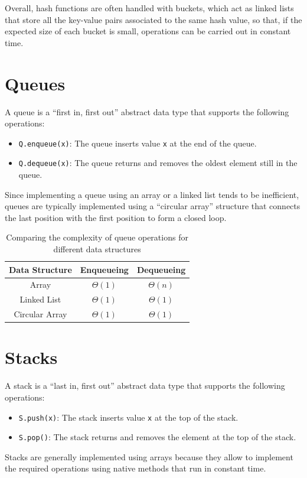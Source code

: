 \documentclass{report}
\begin{document}
\noindent Overall, hash functions are often handled with buckets, which act as linked lists that store all the key-value pairs associated to the same hash value, so that, if the expected size of each bucket is small, operations can be carried out in constant time.
\section{Queues}
A queue is a ``first in, first out'' abstract data type that supports the following operations:
\begin{itemize}
    \item \texttt{Q.enqueue(x)}: The queue inserts value \texttt{x} at the end of the queue.
    \item \texttt{Q.dequeue(x)}: The queue returns and removes the oldest element still in the queue.
\end{itemize}
Since implementing a queue using an array or a linked list tends to be inefficient, queues are typically implemented using a ``circular array'' structure that connects the last position with the first position to form a closed loop.
\begin{table}[H]
    \centering
    \begin{tabular}{|c|c|c|}
        \hline
        \textbf{Data Structure} & \textbf{Enqueueing} & \textbf{Dequeueing} \\
        \hline
        Array & $\displaystyle \Theta(1)$ & $\displaystyle \Theta(n)$ \\
        \hline
        Linked List & $\displaystyle \Theta(1)$ & $\displaystyle \Theta(1)$ \\
        \hline
        Circular Array & $\displaystyle \Theta(1)$ & $\displaystyle \Theta(1)$ \\
        \hline
    \end{tabular}
    \caption{Comparing the complexity of queue operations for different data structures}
    \label{tab:queue_operations}
\end{table}
\section{Stacks}
A stack is a ``last in, first out'' abstract data type that supports the following operations:
\begin{itemize}
    \item \texttt{S.push(x)}: The stack inserts value \texttt{x} at the top of the stack.
    \item \texttt{S.pop()}: The stack returns and removes the element at the top of the stack.
\end{itemize}
Stacks are generally implemented using arrays because they allow to implement the required operations using native methods that run in constant time.
\end{document}
